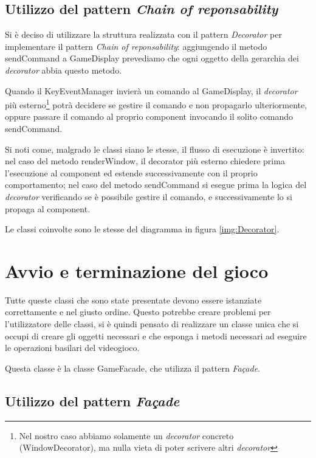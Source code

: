\documentclass[a4paper,12pt]{article}
\begin{document}
\subsection{Utilizzo del pattern \emph{Chain of reponsability}}

Si \`e deciso di utilizzare la struttura realizzata con il pattern \emph{Decorator} per implementare il pattern \emph{Chain of reponsability}: aggiungendo il metodo \textsf{sendCommand} a \textsf{GameDisplay} prevediamo che ogni oggetto della gerarchia dei \textit{decorator} abbia questo metodo.

Quando il \textsf{KeyEventManager} invier\`a un comando al \textsf{GameDisplay}, il \textit{decorator} pi\`u esterno\footnote{Nel nostro caso abbiamo solamente un \emph{decorator} concreto (\textsf{WindowDecorator}), ma nulla vieta di poter scrivere altri \textit{decorator}} potr\`a decidere se gestire il comando e non propagarlo ulteriormente, oppure passare il comando al proprio \textsf{component} invocando il solito comando \textsf{sendCommand}.

Si noti come, malgrado le classi siano le stesse, il flusso di esecuzione \`e invertito: nel caso del metodo \textsf{renderWindow}, il decorator pi\`u esterno chiedere prima l'esecuzione al \textsf{component} ed estende successivamente con il proprio comportamento; nel caso del metodo \textsf{sendCommand} si esegue prima la logica del \textit{decorator} verificando se \`e possibile gestire il comando, e successivamente lo si propaga al \textsf{component}.

Le classi coinvolte sono le stesse del diagramma in figura \ref{img:Decorator}.

\section{Avvio e terminazione del gioco}
\label{sec:avvio}

Tutte queste classi che sono state presentate devono essere istanziate correttamente e nel giusto ordine. Questo potrebbe creare problemi per l'utilizzatore delle classi, si \`e quindi pensato di realizzare un classe unica che si occupi di creare gli oggetti necessari e che esponga i metodi necessari ad eseguire le operazioni basilari del videogioco.

Questa classe \`e la classe \textsf{GameFacade}, che utilizza il pattern \emph{Façade}.

\subsection{Utilizzo del pattern \emph{Façade}}
\end{document}
